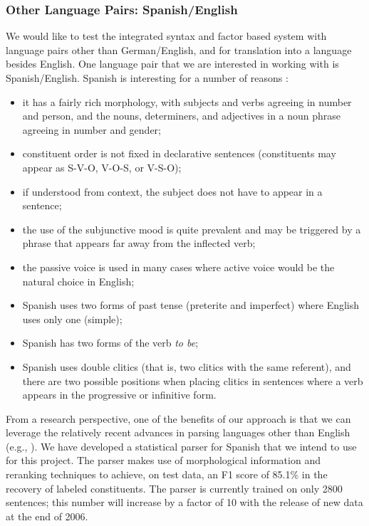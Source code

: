\documentclass[10pt]{report}
\theoremstyle{plain}
\begin{document}
{\subsubsection{Other Language Pairs: Spanish/English}
We would like to test the integrated syntax and factor based system
with language pairs other than German/English, and for translation
into a language besides English.  One language pair that we are
interested in working with is Spanish/English. Spanish is interesting
for a number of reasons :

\begin{itemize}
\item it has a fairly rich morphology, with subjects and verbs
agreeing in number and person, and the nouns, determiners, and
adjectives in a noun phrase agreeing in number and gender;
\item constituent order is not fixed in declarative sentences
(constituents may appear as S-V-O, V-O-S, or V-S-O);
\item if understood from context, the subject does not have to appear
in a sentence;
\item the use of the subjunctive mood is quite prevalent and may be
triggered by a phrase that appears far away from the inflected verb;
\item the passive voice is used in many cases where active voice would
be the natural choice in English;
\item Spanish uses two forms of past tense (preterite and imperfect)
where English uses only one (simple);
\item Spanish has two forms of the verb {\em to be};
\item Spanish uses double clitics (that is, two clitics with the same
referent), and there are two possible positions when placing clitics
in sentences where a verb appears in the progressive or infinitive
form.
\end{itemize} 

From a research perspective, one of the benefits of our approach is
that we can leverage the relatively recent advances in parsing
languages other than English (e.g.,
). We have developed a
statistical parser for Spanish  that we intend to use
for this project. The parser makes use of morphological information
and reranking techniques to achieve, on test data, an F1 score of
85.1\% in the recovery of labeled constituents.  The parser is
currently trained on only 2800 sentences; this number will increase by
a factor of 10 with the release of new data at the end of 2006.

}
\end{document}
